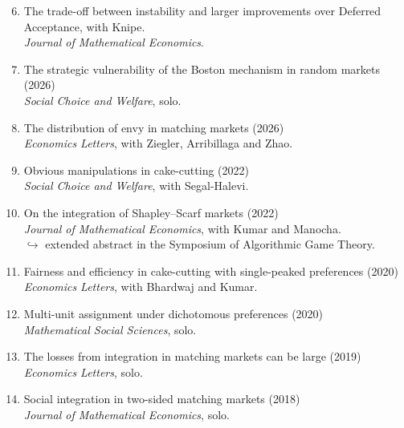 \documentclass[11pt,a4paper]{article}
\begin{document}
\begin{enumerate}[leftmargin=*]
	  \setcounter{enumi}{5}
	
		\item {The trade-off between instability and larger improvements over Deferred Acceptance}, with Knipe.\\
	\textit{Journal of Mathematical Economics}.
	
	\item{The strategic vulnerability of the Boston mechanism in random markets} (2026)\\
	\textit{Social Choice and Welfare}, solo.
	
	\item  {The distribution of envy in matching markets} (2026)\\
	\textit{Economics Letters}, with Ziegler, Arribillaga and Zhao.
	
	\item {Obvious manipulations in cake-cutting} (2022)\\
	\textit{Social Choice and Welfare}, with Segal-Halevi.
	
	\item {On the integration of Shapley–Scarf markets} (2022)\\
	\textit{Journal of Mathematical Economics}, with Kumar and Manocha.\\
	$\hookrightarrow$ extended abstract in the Symposium of Algorithmic Game Theory.
	
	\item {Fairness and efficiency in cake-cutting with single-peaked preferences} (2020)\\
	\textit{Economics Letters}, with Bhardwaj and Kumar.
	
	\item {Multi-unit assignment under dichotomous preferences} (2020)\\
	\textit{Mathematical Social Sciences}, solo.
	
	\item {The losses from integration in matching markets can be large} (2019)\\
	\textit{Economics Letters}, solo.
	
	
	\item {Social integration in two-sided matching markets} (2018)\\
	\textit{Journal of Mathematical Economics}, solo.
\end{enumerate}
\end{document}
